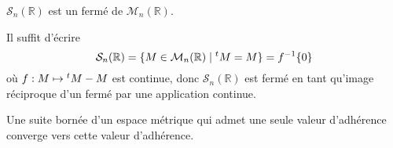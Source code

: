 




	\begin{lemma}
		\label{homeomorphisme-de-l-exponentielle-1}
		$\mathcal{S}_n(\mathbb{R})$ est un fermé de $\mathcal{M}_n(\mathbb{R})$.
	\end{lemma}

	\begin{demonstration}
		Il suffit d'écrire
		\[ \mathcal{S}_n(\mathbb{R}) = \{ M \in \mathcal{M}_n(\mathbb{R}) \mid \mathstrut ^t M = M \} = f^{-1}\{ 0 \} \]
		où $f : M \mapsto \mathstrut ^t M - M$ est continue, donc $\mathcal{S}_n(\mathbb{R})$ est fermé en tant qu'image réciproque d'un fermé par une application continue.
	\end{demonstration}

	\begin{lemma}
		\label{homeomorphisme-de-l-exponentielle-2}
		Une suite bornée d'un espace métrique qui admet une seule valeur d'adhérence converge vers cette valeur d'adhérence.
	\end{lemma}

